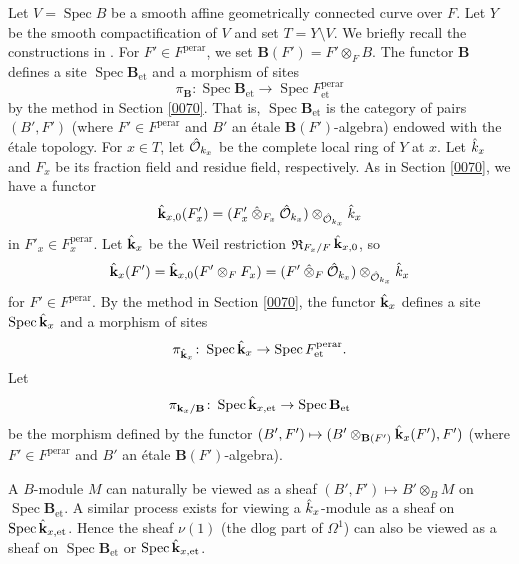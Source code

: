 \documentclass{amsart}
\theoremstyle{remark}
\numberwithin{equation}{section}
\newcommand{\Order}{\mathcal{O}}
\newcommand{\tensor}{\mathbin{\otimes}}
\newcommand{\et}{\mathrm{et}}
\newcommand{\perar}{\mathrm{perar}}
\newcommand{\alg}[1]{\mathbf{#1}}
\newcommand{\ctensor}{\mathbin{\Hat{\otimes}}}
\DeclareMathOperator{\Spec}{Spec}
\DeclareMathOperator{\Weil}{\mathfrak{R}}
\begin{document}
Let $V = \Spec B$ be a smooth affine geometrically connected curve over $F$.
Let $Y$ be the smooth compactification of $V$ and set $T = Y \setminus V$.
We briefly recall the constructions in \cite[Section 9.1]{Suz24}.
For $F' \in F^{\perar}$, we set $\alg{B}(F') = F' \tensor_{F} B$.
The functor $\alg{B}$ defines a site $\Spec \alg{B}_{\et}$
and a morphism of sites
	\[
			\pi_{\alg{B}}
		\colon
			\Spec \alg{B}_{\et}
		\to
			\Spec F^{\perar}_{\et}
	\]
by the method in Section \ref{0070}.
That is, $\Spec \alg{B}_{\et}$ is the category of pairs $(B', F')$
(where $F' \in F^{\perar}$ and $B'$ an \'etale $\alg{B}(F')$-algebra)
endowed with the \'etale topology.
For $x \in T$, let $\Hat{\Order}_{k_{x}}$ be the complete local ring of $Y$ at $x$.
Let $\Hat{k}_{x}$ and $F_{x}$ be its fraction field and residue field, respectively.
As in Section \ref{0070},
we have a functor
	\[
			\Hat{\alg{k}}_{x, 0}(F'_{x})
		=
			(F'_{x} \ctensor_{F_{x}} \Hat{\Order}_{k_{x}}) \tensor_{\Hat{\Order}_{k_{x}}} \Hat{k}_{x}
	\]
in $F'_{x} \in F_{x}^{\perar}$.
Let $\Hat{\alg{k}}_{x}$ be the Weil restriction $\Weil_{F_{x} / F} \Hat{\alg{k}}_{x, 0}$,
so
	\[
			\Hat{\alg{k}}_{x}(F')
		=
			\Hat{\alg{k}}_{x, 0}(F' \tensor_{F} F_{x})
		=
			(F' \ctensor_{F} \Hat{\Order}_{k_{x}}) \tensor_{\Hat{\Order}_{k_{x}}} \Hat{k}_{x}
	\]
for $F' \in F^{\perar}$.
By the method in Section \ref{0070},
the functor $\Hat{\alg{k}}_{x}$ defines a site $\Spec \Hat{\alg{k}}_{x}$ and a morphism of sites
	\[
			\pi_{\Hat{\alg{k}}_{x}}
		\colon
			\Spec \Hat{\alg{k}}_{x}
		\to
			\Spec F^{\perar}_{\et}.
	\]
Let
	\[
			\pi_{\alg{k}_{x} / \alg{B}}
		\colon
			\Spec \Hat{\alg{k}}_{x, \et}
		\to
			\Spec \alg{B}_{\et}
	\]
be the morphism defined by the functor $(B', F') \mapsto (B' \tensor_{\alg{B}(F')} \Hat{\alg{k}}_{x}(F'), F')$
(where $F' \in F^{\perar}$ and $B'$ an \'etale $\alg{B}(F')$-algebra).

A $B$-module $M$ can naturally be viewed as a sheaf
$(B', F') \mapsto B' \tensor_{B} M$ on $\Spec \alg{B}_{\et}$.
A similar process exists for viewing a $\Hat{k}_{x}$-module as a sheaf on $\Spec \Hat{\alg{k}}_{x, \et}$.
Hence the sheaf $\nu(1)$ (the dlog part of $\Omega^{1}$) can also be viewed
as a sheaf on $\Spec \alg{B}_{\et}$ or $\Spec \Hat{\alg{k}}_{x, \et}$.
\end{document}

